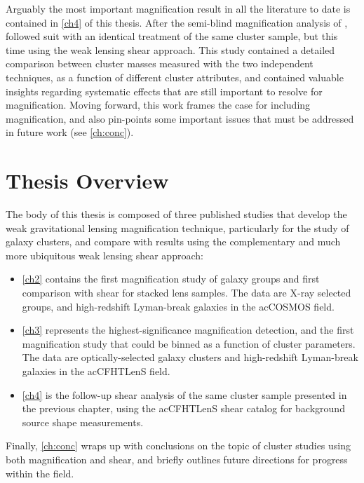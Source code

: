Arguably the most important magnification result in all the literature to date is contained in \autoref{ch4} of this thesis. After the semi-blind magnification analysis of \citet{Ford14}, \citet{Ford15} followed suit with an identical treatment of the same cluster sample, but this time using the weak lensing shear approach. This study contained a detailed comparison between cluster masses measured with the two independent techniques, as a function of different cluster attributes, and contained valuable insights regarding systematic effects that are still important to resolve for magnification. Moving forward, this work frames the case for including magnification, and also pin-points some important issues that must be addressed in future work (see \autoref{ch:conc}).

\section{Thesis Overview}
\label{sec:Overview}

The body of this thesis is composed of three published studies that develop the weak gravitational lensing magnification technique, particularly for the study of galaxy clusters, and compare with results using the complementary and much more ubiquitous weak lensing shear approach:
\begin{itemize}
\item \autoref{ch2} contains the first magnification study of galaxy groups and first comparison with shear for stacked lens samples. The data are X-ray selected groups, and high-redshift Lyman-break galaxies in the ac{COSMOS} field.
\item \autoref{ch3} represents the highest-significance magnification detection, and the first magnification study that could be binned as a function of cluster parameters. The data are optically-selected galaxy clusters and high-redshift Lyman-break galaxies in the ac{CFHTLenS} field.
\item \autoref{ch4} is the follow-up shear analysis of the same cluster sample presented in the previous chapter, using the ac{CFHTLenS} shear catalog for background source shape measurements.
\end{itemize}
Finally, \autoref{ch:conc} wraps up with conclusions on the topic of cluster studies using both magnification and shear, and briefly outlines future directions for progress within the field.

\endinput
Any text after an \endinput is ignored.
You could put scraps here or things in progress.
